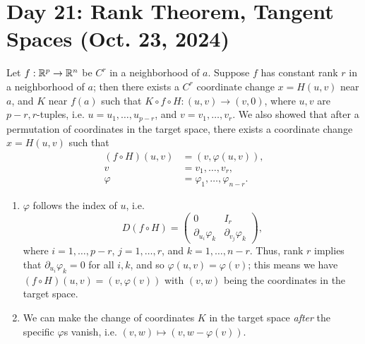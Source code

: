 \section{Day 21: Rank Theorem, Tangent Spaces (Oct. 23, 2024)}
Let $f : \mathbb R^p \to \mathbb R^n$ be $C^r$ in a neighborhood of $a$. Suppose $f$ has constant rank $r$ in a neighborhood of $a$; then there exists a $C^r$ coordinate change $x = H(u, v)$ near $a$, and $K$ near $f(a)$ such that $K \circ f \circ H : (u, v) \to (v, 0)$, where $u, v$ are $p-r, r$-tuples, i.e. $u = u_1, \dots, u_{p-r}$, and $v = v_1, \dots, v_r$. We also showed that after a permutation of coordinates in the target space, there exists a coordinate change $x = H(u, v)$ such that
\begin{align*}
    (f \circ H)(u, v) &= (v, \varphi(u, v)), \\
    v &= v_1, \dots, v_r, \\
    \varphi &= \varphi_1, \dots, \varphi_{n-r}.
\end{align*}
\begin{enumerate}[label=(\alph*)]
    \item $\varphi$ follows the index of $u$, i.e.
    \[ D(f \circ H) = \left(\begin{array}{c|c} 0 & I_r \\ \hline \partial_{u_i} \varphi_k & \partial_{v_j} \varphi_k \end{array}\right), \]
    where $i = 1, \dots, p-r$, $j = 1, \dots, r$, and $k = 1, \dots, n-r$. Thus, rank $r$ implies that $\partial_{u_i} \varphi_k = 0$ for all $i, k$, and so $\varphi(u, v) = \varphi(v)$; this means we have $(f \circ H)(u, v) = (v, \varphi(v))$ with $(v, w)$ being the coordinates in the target space.

    \item We can make the change of coordinates $K$ in the target space \textit{after} the specific $\varphi$s vanish, i.e. $(v, w) \mapsto (v, w - \varphi(v))$.
\end{enumerate}

